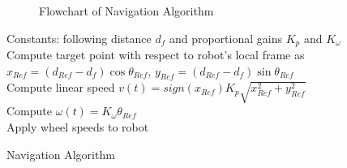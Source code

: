 \documentclass[letterpaper,12pt]{article}   %
\begin{document}
\begin{figure}
  \centering
  
  \caption{Flowchart of Navigation Algorithm}
  \label{fig:navAlgoFlowchart}
\end{figure}

\begin{algorithm}[h!]
  \SetAlgoLined
  Constants: following distance $d_f$ and proportional gains $K_p$ and $K_\omega$\\
  \Begin
  {
    Compute target point with respect to robot's local frame as $x_{Ref} = (d_{Ref} - d_f)\cos \theta_{Ref}$, $y_{Ref} = (d_{Ref} - d_f)\sin \theta_{Ref}$\\
    Compute linear speed $v(t) = sign(x_{Ref})K_p\sqrt{x_{Ref}^2 + y_{Ref}^2}$\\
    Compute $\omega(t) = K_\omega \theta_{Ref}$\\
    Apply wheel speeds to robot\\
  }
  \caption{Navigation Algorithm}
  \label{alg:navAlgo}
\end{algorithm}






\end{document}

